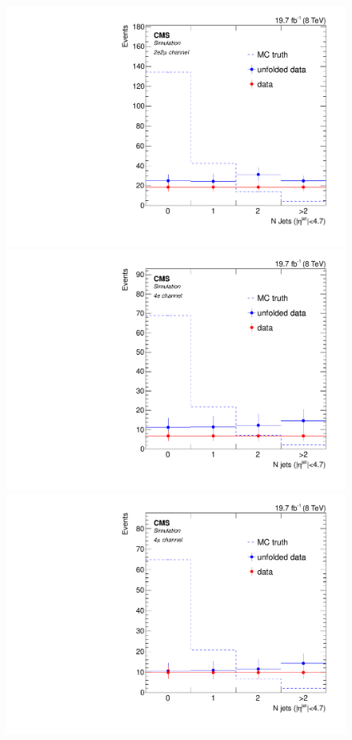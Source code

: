 \begin{figure}[hbtp]
\begin{center}
    \includegraphics[width=0.8\cmsFigWidth]{Figures/Unfolding/MCTests/Biased_Distributions/Jets_ZZTo2e2m_Mad_fr_SVD_4}
    \includegraphics[width=0.8\cmsFigWidth]{Figures/Unfolding/MCTests/Biased_Distributions/Jets_ZZTo4e_Mad_fr_bayes_4}     
    \includegraphics[width=0.8\cmsFigWidth]{Figures/Unfolding/MCTests/Biased_Distributions/Jets_ZZTo4m_Mad_fr_bayes_4}     

\end{center}
\end{figure}
